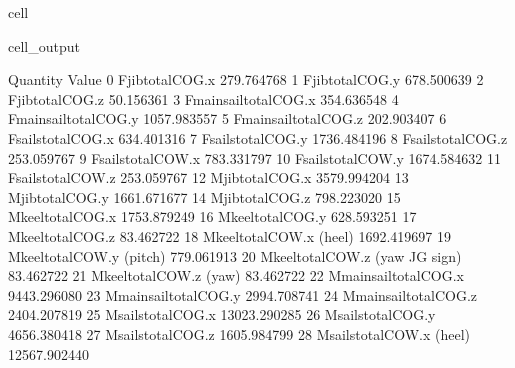 \documentclass[a4paper,12pt,english]{jupyterBook}
\begin{document}
\begin{sphinxuseclass}{cell}
\begin{sphinxVerbatimOutput}
\begin{sphinxuseclass}{cell_output}
\begin{sphinxVerbatim}[commandchars=\\\{\}]
                               Quantity         Value
0                     F\PYGZus{}jib\PYGZus{}total\PYGZus{}COG.x   \PYGZhy{}279.764768
1                     F\PYGZus{}jib\PYGZus{}total\PYGZus{}COG.y    678.500639
2                     F\PYGZus{}jib\PYGZus{}total\PYGZus{}COG.z    \PYGZhy{}50.156361
3               F\PYGZus{}main\PYGZus{}sail\PYGZus{}total\PYGZus{}COG.x   \PYGZhy{}354.636548
4               F\PYGZus{}main\PYGZus{}sail\PYGZus{}total\PYGZus{}COG.y   1057.983557
5               F\PYGZus{}main\PYGZus{}sail\PYGZus{}total\PYGZus{}COG.z   \PYGZhy{}202.903407
6                   F\PYGZus{}sails\PYGZus{}total\PYGZus{}COG.x   \PYGZhy{}634.401316
7                   F\PYGZus{}sails\PYGZus{}total\PYGZus{}COG.y   1736.484196
8                   F\PYGZus{}sails\PYGZus{}total\PYGZus{}COG.z   \PYGZhy{}253.059767
9                   F\PYGZus{}sails\PYGZus{}total\PYGZus{}COW.x   \PYGZhy{}783.331797
10                  F\PYGZus{}sails\PYGZus{}total\PYGZus{}COW.y   1674.584632
11                  F\PYGZus{}sails\PYGZus{}total\PYGZus{}COW.z   \PYGZhy{}253.059767
12                    M\PYGZus{}jib\PYGZus{}total\PYGZus{}COG.x  \PYGZhy{}3579.994204
13                    M\PYGZus{}jib\PYGZus{}total\PYGZus{}COG.y  \PYGZhy{}1661.671677
14                    M\PYGZus{}jib\PYGZus{}total\PYGZus{}COG.z   \PYGZhy{}798.223020
15                   M\PYGZus{}keel\PYGZus{}total\PYGZus{}COG.x  \PYGZhy{}1753.879249
16                   M\PYGZus{}keel\PYGZus{}total\PYGZus{}COG.y   \PYGZhy{}628.593251
17                   M\PYGZus{}keel\PYGZus{}total\PYGZus{}COG.z     83.462722
18            M\PYGZus{}keel\PYGZus{}total\PYGZus{}COW.x (heel)  \PYGZhy{}1692.419697
19           M\PYGZus{}keel\PYGZus{}total\PYGZus{}COW.y (pitch)   \PYGZhy{}779.061913
20   M\PYGZus{}keel\PYGZus{}total\PYGZus{}COW.z (yaw \PYGZhy{} JG sign)    \PYGZhy{}83.462722
21             M\PYGZus{}keel\PYGZus{}total\PYGZus{}COW.z (yaw)     83.462722
22              M\PYGZus{}main\PYGZus{}sail\PYGZus{}total\PYGZus{}COG.x  \PYGZhy{}9443.296080
23              M\PYGZus{}main\PYGZus{}sail\PYGZus{}total\PYGZus{}COG.y  \PYGZhy{}2994.708741
24              M\PYGZus{}main\PYGZus{}sail\PYGZus{}total\PYGZus{}COG.z   2404.207819
25                  M\PYGZus{}sails\PYGZus{}total\PYGZus{}COG.x \PYGZhy{}13023.290285
26                  M\PYGZus{}sails\PYGZus{}total\PYGZus{}COG.y  \PYGZhy{}4656.380418
27                  M\PYGZus{}sails\PYGZus{}total\PYGZus{}COG.z   1605.984799
28           M\PYGZus{}sails\PYGZus{}total\PYGZus{}COW.x (heel) \PYGZhy{}12567.902440

\end{sphinxVerbatim}
\end{sphinxuseclass}
\end{sphinxVerbatimOutput}
\end{sphinxuseclass}
\end{document}
